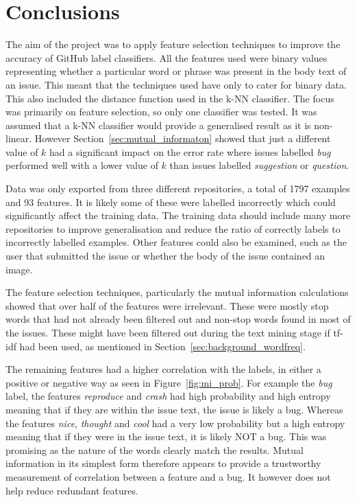 \section{Conclusions}
The aim of the project was to apply feature selection techniques to improve the accuracy of GitHub label classifiers. All the
features used were binary values representing whether a particular word or phrase was present in the body text of an issue. This
meant that the techniques used have only to cater for binary data. This also included the distance function used in the k-NN
classifier. The focus was primarily on feature selection, so only one classifier was tested. It was assumed that a k-NN
classifier would provide a generalised result as it is non-linear. However Section~\ref{sec:mutual_informaton} showed that just
a different value of $k$ had a significant impact on the error rate where issues labelled \textit{bug} performed well with a
lower value of $k$ than issues labelled \textit{suggestion} or \textit{question}.

Data was only exported from three different repositories, a total of 1797 examples and 93 features. It is likely some of these
were labelled incorrectly which could significantly affect the training data. The training data should include many more
repositories to improve generalisation and reduce the ratio of correctly labels to incorrectly labelled examples. Other features
could also be examined, such as the user that submitted the issue or whether the body of the issue contained an image.

The feature selection techniques, particularly the mutual information calculations showed that over half of the features were
irrelevant. These were mostly stop words that had not already been filtered out and non-stop words found in most of the issues.
These might have been filtered out during the text mining stage if tf-idf had been used, as mentioned in
Section~\ref{sec:background_wordfreq}.

The remaining features had a higher correlation with the labels, in either a positive or negative way as seen in
Figure~\ref{fig:mi_prob}. For example the \textit{bug} label, the features \textit{reproduce} and \textit{crash} had high
probability and high entropy meaning that if they are within the issue text, the issue is likely a bug. Whereas the features
\textit{nice}, \textit{thought} and \textit{cool} had a very low probability but a high entropy meaning that if they were in the
issue text, it is likely NOT a bug. This was promising as the nature of the words clearly match the results. Mutual information
in its simplest form therefore appears to provide a trustworthy measurement of correlation between a feature and a bug. It
however does not help reduce redundant features.

